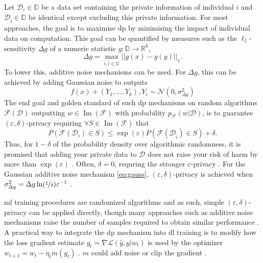 \documentclass[12pt,fleqn,twocolumn]{article}
\newcommand{\RR}{\ensuremath{\mathbb R}}
\newcommand{\DD}{\ensuremath{\mathbb D}}
\newcommand{\reci}{\ensuremath{^{-1}}}
\begin{document}
Let $\mathcal D_i \in \DD$ be a data set containing the private information of individual $i$ and $\mathcal D_{\hat i} \in \DD$ be identical except excluding this private information.
For most approaches, the goal is to maximise \acrshort{dp} by minimising the impact of individual data on computation.
This goal can be quantified by measures such as the $\ell_1$-sensitivity \cite[pp.31]{dwork2014alg} $\Delta g$ of a numeric statistic $g: \DD \rightarrow \RR^k$,
\begin{equation}
    \Delta g= \operatorname{max}_{i, \hat i \in \DD} ||g(x)-g(y)||_1.
\end{equation}
To lower this, additive noise mechanisms can be used.
For $\Delta g$, this can be achieved by adding Gaussian noise to outputs \cite[D 3.3]{dwork2014alg} 
\begin{equation}\label{eq:gauss}
  f(x)+(Y_1, \ldots, Y_k), Y_i \sim \mathcal N(0, \sigma_{\Delta g}^2)  
\end{equation}
The end goal and golden standard of such \acrshort{dp} mechanisms on random algorithms $\mathcal F(\mathcal D)$ outputting $w \in \operatorname{Im}(\mathcal F)$ with probability $p_{\mathcal F}(w|\mathcal D)$, is to guarantee $(\varepsilon, \delta)$-privacy \cite[Def. 2.4]{dwork2014alg} requiring $\forall S \in \operatorname{Im}(\mathcal F)$ that
\begin{equation}
    P\left(
        \mathcal{F}(\mathcal D_i) \in S
    \right)
    \leq
    \exp(\varepsilon)
    P\left(
        \mathcal{F}(\mathcal D_{\hat i}) \in S
    \right)
    +\delta.
\end{equation}
Thus, for $1-\delta$ of the probability density over algorithmic randomness, it is promised that adding your private data to $\mathcal D$ does not raise your risk of harm by more than $\exp(\varepsilon)$ \cite[pp. 21]{dwork2014alg}.
Often, $\delta=0$, requring the stronger $\varepsilon$-privacy \cite{wiki2022diff}.
For the Gaussian additive noise mechanism \eqref{eq:gauss}, $(\varepsilon, \delta)$-privacy is achieved when $\sigma_{\Delta g}^2=\Delta g \ln(\nicefrac 1 \delta)\varepsilon\reci$ \cite[App. A]{dwork2014alg}.

\acrshort{ml} training procedures are randomized algorithms and as such, simple $(\varepsilon, \delta)$-privacy can be applied directly, though many approaches such as additive noise mechanisms raise the number of samples required to obtain similar performance \cite[pp.221]{dwork2014alg}.
A practical way to integrate the \acrshort{dp} mechanism into \acrshort{dl} training is to modify how the loss gradient estimate $g_t = \nabla \mathcal L(\hat y, y | w_t)$ is used by the optimizer $w_{t+1} = w_t - \eta_t m(g_t)$ \cite{rade2019tensorflow}.
$m$ could add noise or clip the gradient \cite{abadi2016dldp}.
\end{document}
